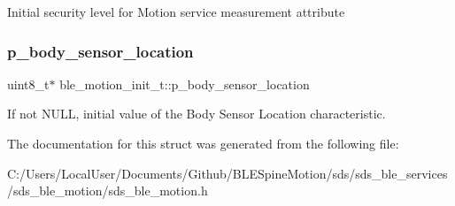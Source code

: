 Initial security level for Motion service measurement attribute \mbox{\label{structble__motion__init__t_a6a7d65af831d1d0d9d1714a0b1d657a0}} 
\subsubsection{\texorpdfstring{p\_body\_sensor\_location}{p\_body\_sensor\_location}}
{\footnotesize\ttfamily uint8\+\_\+t$\ast$ ble\+\_\+motion\+\_\+init\+\_\+t\+::p\+\_\+body\+\_\+sensor\+\_\+location}

If not N\+U\+LL, initial value of the Body Sensor Location characteristic. 

The documentation for this struct was generated from the following file\+:\begin{DoxyCompactItemize}
\item 
C\+:/\+Users/\+Local\+User/\+Documents/\+Github/\+B\+L\+E\+Spine\+Motion/sds/sds\+\_\+ble\+\_\+services/sds\+\_\+ble\+\_\+motion/sds\+\_\+ble\+\_\+motion.\+h\end{DoxyCompactItemize}
